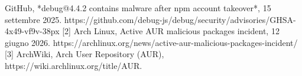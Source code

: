 \printbibliography[heading=bibintoc,title={Bibliografia}]
[1] GitHub, *debug@4.4.2 contains malware after npm account takeover*, 15 settembre 2025. https://github.com/debug-js/debug/security/advisories/GHSA-4x49-vf9v-38px
[2] Arch Linux, Active AUR malicious packages incident, 12 giugno 2026. https://archlinux.org/news/active-aur-malicious-packages-incident/
[3] ArchWiki, Arch User Repository (AUR), https://wiki.archlinux.org/title/AUR.
